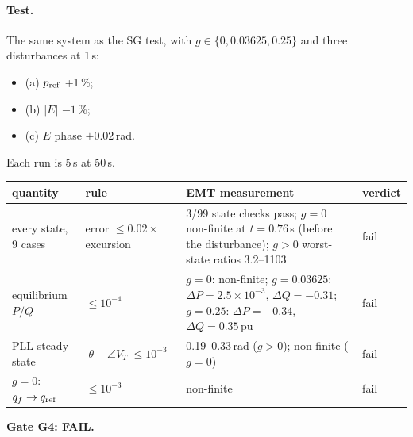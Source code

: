 \documentclass[10pt,a4paper]{article}
\newcommand{\us}{\,\textmu s}
\begin{document}
\paragraph{Test.} The same system as the SG test, with
$g\in\{0,0.03625,0.25\}$ and three disturbances at 1\,s:
\begin{itemize}
\item (a) $p_{\rm ref}$ +1\,\%;
\item (b) $|E|$ $-1$\,\%;
\item (c) $E$ phase $+0.02$\,rad.
\end{itemize}
Each run is 5\,s at 50\us.

\medskip
\noindent\begin{tabularx}{\linewidth}{@{}L{3.6cm}L{3.2cm}Yl@{}}
\toprule
quantity & rule & EMT measurement & verdict\\
\midrule
every state, 9 cases & error $\le0.02\times$ excursion & 3/99 state checks pass; $g=0$ non-finite at $t=0.76$\,s (before the disturbance); $g>0$ worst-state ratios 3.2--1103 & fail\\
equilibrium $P/Q$ & $\le10^{-4}$ & $g=0$: non-finite; $g=0.03625$: $\Delta P=2.5\times10^{-3}$, $\Delta Q=-0.31$; $g=0.25$: $\Delta P=-0.34$, $\Delta Q=0.35$\,pu & fail\\
PLL steady state & $|\theta-\angle V_T|\le10^{-3}$ & 0.19--0.33\,rad ($g>0$); non-finite ($g=0$) & fail\\
$g=0$: $q_f\to q_{\rm ref}$ & $\le10^{-3}$ & non-finite & fail\\
\bottomrule
\end{tabularx}

\medskip
\noindent\textbf{Gate G4: FAIL.}
\end{document}
